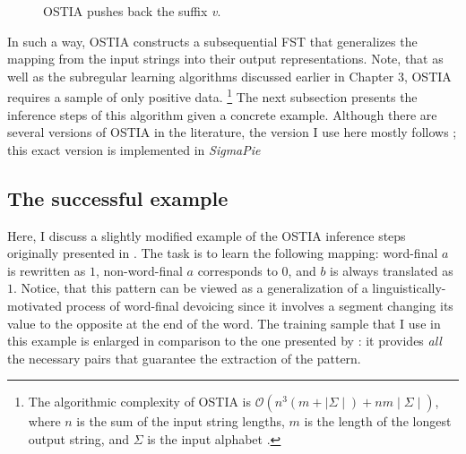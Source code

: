 \begin{figure}[h!] 
\centering
{}
%
\hspace{3em}
%
\caption{OSTIA pushes back the suffix \emph{v}.}
\label{pushbackostia}
\end{figure}


In such a way, OSTIA constructs a subsequential FST that generalizes the mapping from the input strings into their output representations.
Note, that as well as the subregular learning algorithms discussed earlier in Chapter $3$, OSTIA requires a sample of only positive data.%
\footnote{The algorithmic complexity of OSTIA is $\mathcal{O}(n^3(m + \mid\Sigma\mid) + nm\mid\Sigma\mid)$, where $n$ is the sum of the input string lengths, $m$ is the length of the longest output string, and $\Sigma$ is the input alphabet \citep{DeLaHiguera2010}.}
The next subsection presents the inference steps of this algorithm given a concrete example.
Although there are several versions of OSTIA in the literature, the version I use here mostly follows \cite{DeLaHiguera2010}; this exact version is implemented in \emph{SigmaPie}



\subsection{The successful example}
\label{exam1}

Here, I discuss a slightly modified example of the OSTIA inference steps originally presented in \cite{DeLaHiguera2010}.
The task is to learn the following mapping: word-final $a$ is rewritten as $1$, non-word-final $a$ corresponds to $0$, and $b$ is always translated as $1$.
Notice, that this pattern can be viewed as a generalization of a linguistically-motivated process of word-final devoicing since it involves a segment changing its value to the opposite at the end of the word.
The training sample that I use in this example is enlarged in comparison to the one presented by \cite{DeLaHiguera2010}: it provides \emph{all} the necessary pairs that guarantee the extraction of the pattern.

